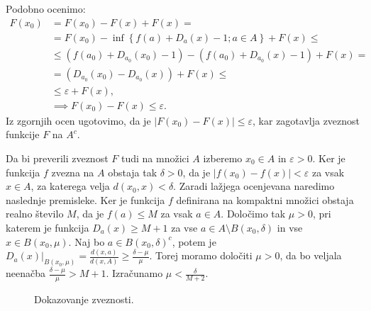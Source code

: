 \documentclass[mat1]{fmfdelo}
\newcommand{\0}{\underline{0}}
\begin{document}
\begin{dokaz}
Podobno ocenimo:
\begin{equation*} \label{eq1}
\begin{split}
F(x_0) & = F(x_0) - F(x) + F(x) = \\
& = F(x_0) - \inf \left \{ f(a) + D_a(x) - 1; a \in A \right \} + F(x) \leq \\
& \leq (f(a_0) + D_{a_0}(x_0) - 1) -  (f(a_0) + D_{a_0}(x) - 1) + F(x) = \\
& = (D_{a_0}(x_0) -  D_{a_0}(x)) + F(x) \leq \\
& \leq \varepsilon + F(x), \\
& \implies F(x_0) - F(x) \leq \varepsilon.
\end{split}
\end{equation*}
Iz zgornjih ocen ugotovimo, da je $|F(x_0) - F(x)| \leq \varepsilon$, kar zagotavlja zveznost funkcije $F$ na $A^c$.

Da bi preverili zveznost $F$ tudi na množici $A$ izberemo $x_0 \in A$ in $\varepsilon > 0$. Ker je funkcija $f$ zvezna na $A$ obstaja tak $\delta > 0$, da je $|f(x_0) - f(x)| < \varepsilon$ za vsak $x \in A$, za katerega velja $d(x_0, x) < \delta$. Zaradi lažjega ocenjevana naredimo naslednje premisleke. Ker je funkcija $f$ definirana na kompaktni množici obstaja realno število $M$, da je $f(a) \leq M$ za vsak $a \in A$. Določimo tak $\mu >0$, pri katerem je funkcija $D_a(x) \geq M + 1$ za vse $a \in A \setminus B(x_0, \delta)$ in vse $x \in B(x_0, \mu)$. Naj bo $a \in B(x_0, \delta)^c$, potem je
$D_a(x)|_{B(x_0, \mu)}= \frac{d(x, a)}{d(x, A)} \geq \frac{\delta - \mu}{\mu}$. Torej moramo določiti $\mu > 0$, da bo veljala neenačba $\frac{\delta - \mu}{\mu} > M + 1$. Izračunamo $\mu <\frac{\delta}{M + 2}$.


\begin{figure}[h!]
	\centering
	\caption{Dokazovanje zveznosti.}
\end{figure}


\end{dokaz}
\end{document}
